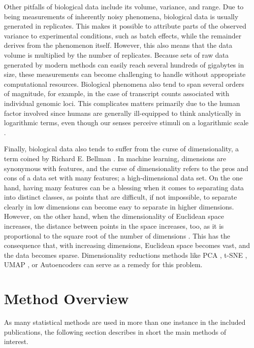 Other pitfalls of biological data include its volume, variance, and range. Due
to being measurements of inherently noisy phenomena, biological data is usually
generated in replicates. This makes it possible to attribute parts of the
observed variance to experimental conditions, such as batch effects, while the
remainder derives from the phenomenon itself. However, this also means that the
data volume is multiplied by the number of replicates. Because sets of raw
data generated by modern methods can easily reach several hundreds of gigabytes
in size, these measurements can become challenging to handle without
appropriate computational resources. Biological phenomena also tend to span
several orders of magnitude, for example, in the case of transcript counts
associated with individual genomic loci. This complicates matters primarily due
to the human factor involved since humans are generally ill-equipped to think
analytically in logarithmic terms, even though our senses perceive stimuli on a
logarithmic scale \citep{Sun2012a}.

Finally,\label{mar:dimensionality}
biological data also tends to suffer from the curse of dimensionality, a term
coined by  Richard E. Bellman \citep{Bellman1957,Bellman1961}. In machine
learning, dimensions are synonymous with features, and the curse of
dimensionality refers to the pros and cons of a data set with many features; a
high-dimensional data set. On the one hand, having many features can be a
blessing when it comes to separating data into distinct classes, as points that
are difficult, if not impossible, to separate clearly in low dimensions can
become easy to separate in higher dimensions. However, on the other hand, when
the dimensionality of Euclidean space increases, the distance between points in
the space increases, too, as it is proportional to the square root of the
number of dimensions \citep{Tabak2014}. This has the consequence that, with
increasing dimensions, Euclidean space becomes vast, and the data becomes
sparse. Dimensionality reductions methods like PCA \citep{Pearson1901}, t-SNE
\citep{Hinton}, UMAP \citep{McInnes2018}, or Autoencoders \citep{Kramer1991}
can serve as a remedy for this problem.


\section{Method Overview}\label{sec:methoverview}
As many statistical methods are used in more than one instance in the included
publications, the following section describes in short the main methods of
interest.
\bigbreak

